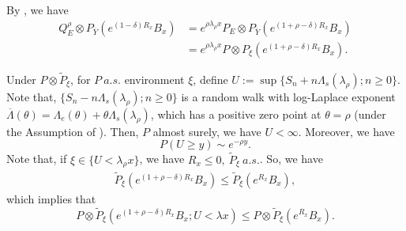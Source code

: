 \documentclass[]{article}
\makeatletter
\numberwithin{equation}{section}
\renewenvironment{proof}[1][\proofname]{%
	\par\pushQED{\qed}\normalfont%
	\topsep6\p@\@plus6\p@\relax
	\trivlist\item[\hskip\labelsep\bfseries#1\@addpunct{.}]%
	\ignorespaces
}{%
	\popQED\endtrivlist\@endpefalse
}
\theoremstyle{thmstyleone}%
\theoremstyle{thmstyletwo}%
\theoremstyle{thmstylethree}%
\theoremstyle{thmstylefour}%
\theoremstyle{thmstylefive}%
\theoremstyle{thmstylesix}%
\makeatother
\begin{document}
	\begin{proof}[Proof of \Cref{lemma of weakly 2}]
	By , we have
	\begin{align}
		Q^\rho_E\otimes P_{\overline{Y}} \left(
		e^{(1-\delta)R_x} B_x
		\right) &= 
		e^{\rho\lambda_\rho x}P_E\otimes P_{\overline{Y}} \left(
		e^{(1+\rho-\delta) R_x} B_x
		\right)
		\nonumber\\
		&= e^{\rho\lambda_\rho x}
		P\otimes P_{\xi} \left( e^{(1+\rho-\delta) R_x} B_x \right).
	\end{align}
	
	Under $P\otimes \tilde{P}_\xi$, 
	for $P~a.s.$ environment $\xi$, 
	define $U:=\sup\{S_n+n\Lambda_s(\lambda_\rho);n\geqslant 0\}$.
	Note that, $\{S_n-n\Lambda_s(\lambda_\rho);n\geqslant 0\}$ is a random walk with log-Laplace exponent $ \overline{\Lambda}(\theta)=\Lambda_e(\theta)+\theta \Lambda_s(\lambda_\rho) $, which has a positive zero point at $\theta=\rho$ (under the Assumption of ).
	Then, $P$ almost surely, we have $U<\infty$. 
	Moreover, we have
	\begin{equation*}
		P(U\geqslant y) \sim e^{-\rho y}.
	\end{equation*}
	Note that, if $\xi\in \{U <\lambda_\rho x\}$, we have $R_x\leqslant 0,~ \tilde{P}_\xi~a.s.$. So, we have
	\begin{align*}
		\tilde{P}_\xi(e^{(1+\rho-\delta)R_x}B_x)
		\leqslant\tilde{P}_\xi(e^{R_x}B_x),
	\end{align*}
	which implies that
	\begin{equation*}
		P\otimes \tilde{P}_\xi (e^{(1+\rho-\delta)R_x}B_x;U<\lambda x)\leqslant
		P\otimes \tilde{P}_\xi (e^{R_x}B_x).
	\end{equation*}
	

\end{proof}
\end{document}
